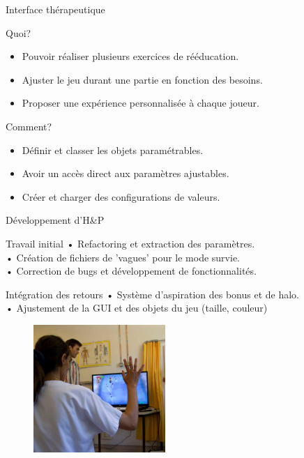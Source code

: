 \documentclass{beamer}
\begin{document}
		\begin{frame}{Interface thérapeutique}
			\begin{block}{Quoi?}
				\begin{itemize}
					\item<1> Pouvoir réaliser plusieurs exercices de rééducation.
					\item<2> Ajuster le jeu durant une partie en fonction des besoins.
					\item<3> Proposer une expérience personnalisée à chaque joueur.
				\end{itemize}
			\end{block}
			\begin{block}{Comment?}
				\begin{itemize}
					\item<1> Définir et classer les objets paramétrables.
					\item<2> Avoir un accès direct aux paramètres ajustables.			
					\item<3> Créer et charger des configurations de valeurs.
				\end{itemize}
			\end{block}
		\end{frame}			
		
		\begin{frame}{Développement d'H\&P}
			\begin{block}{Travail initial}
				• Refactoring et extraction des paramètres.\\
				• Création de fichiers de 'vagues' pour le mode survie.\\
				• Correction de bugs et développement de fonctionnalités.
			\end{block}
			\begin{block}{Intégration des retours}
				• Système d'aspiration des bonus et de halo.\\
				• Ajustement de la GUI et des objets du jeu (taille, couleur)
			\end{block}
			\begin{figure}
				\includegraphics[width=5cm]{../images/test_lapeyronie_2.png}
			\end{figure}			
		\end{frame}
		
\end{document}
